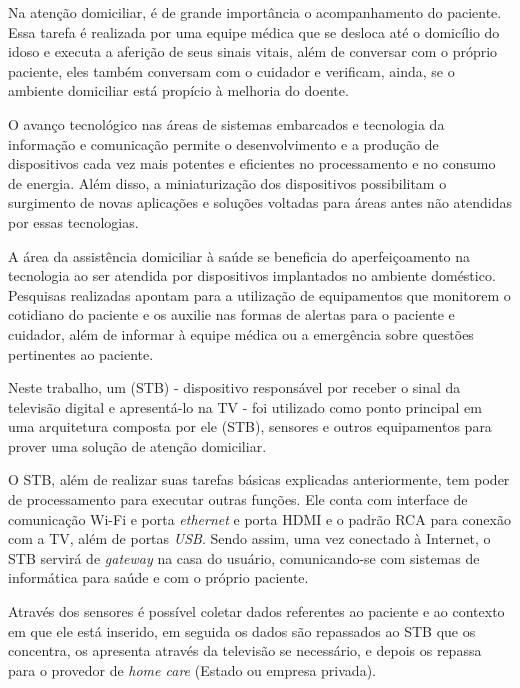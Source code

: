 Na atenção domiciliar, é de grande importância o acompanhamento do paciente.
Essa tarefa é realizada por uma equipe médica que se desloca até o domicílio do
idoso e executa a aferição de seus sinais vitais, além de conversar com o
próprio paciente, eles também conversam com o cuidador e verificam, ainda, se o
ambiente domiciliar está propício à melhoria do doente.

O avanço tecnológico nas áreas de sistemas embarcados e tecnologia da informação
e comunicação permite o desenvolvimento e a produção de dispositivos cada vez
mais potentes e eficientes no processamento e no consumo de energia. Além disso,
a miniaturização dos dispositivos possibilitam o surgimento de novas aplicações
e soluções voltadas para áreas antes não atendidas por essas tecnologias.


A área da assistência domiciliar à saúde se beneficia do aperfeiçoamento na 
tecnologia ao ser atendida por dispositivos implantados no ambiente doméstico. 
Pesquisas realizadas apontam para a utilização de equipamentos que monitorem o 
cotidiano do paciente e os auxilie nas formas de alertas para o paciente e 
cuidador, além de informar à equipe médica ou a emergência sobre questões 
pertinentes ao paciente.

Neste trabalho, um \stb[] (STB) - dispositivo responsável por receber o sinal da 
televisão digital e apresentá-lo na TV - foi utilizado como ponto principal em
uma arquitetura composta por ele (STB), sensores e outros equipamentos para 
prover uma solução de atenção domiciliar.

O STB, além de realizar suas tarefas básicas explicadas anteriormente, tem poder
de processamento para executar outras funções. Ele conta com interface de
comunicação Wi-Fi e porta \textit{ethernet} e porta HDMI e o padrão RCA para
conexão com a TV, além de portas \textit{USB}. Sendo assim, uma vez conectado à
Internet, o STB servirá de \textit{gateway} na casa do usuário, comunicando-se
com sistemas de informática para saúde e com o próprio paciente.

Através dos sensores é possível coletar dados referentes ao paciente e ao 
contexto em que ele está inserido, em seguida os dados são repassados ao STB que 
os concentra, os apresenta através da televisão se necessário, e depois os 
repassa para o provedor de \textit{home care} (Estado ou empresa privada).

